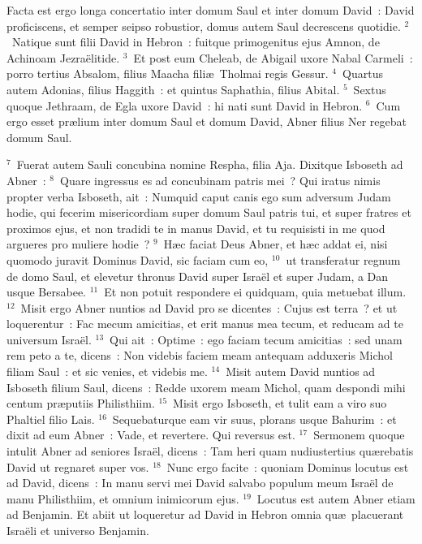 \lettrine[lines=3,image=true,loversize=0.05,lraise=-0.03]{F}{}acta est ergo longa concertatio inter domum Saul et inter domum David~: David proficiscens, et semper seipso robustior, domus autem Saul decrescens quotidie.
${}^{2}$~Natique sunt filii David in Hebron~: fuitque primogenitus ejus Amnon, de Achinoam Jezra\"elitide.
${}^{3}$~Et post eum Cheleab, de Abigail uxore Nabal Carmeli~: porro tertius Absalom, filius Maacha fili\ae\ Tholmai regis Gessur.
${}^{4}$~Quartus autem Adonias, filius Haggith~: et quintus Saphathia, filius Abital.
${}^{5}$~Sextus quoque Jethraam, de Egla uxore David~: hi nati sunt David in Hebron.
${}^{6}$~Cum ergo esset pr\ae lium inter domum Saul et domum David, Abner filius Ner regebat domum Saul.


${}^{7}$~Fuerat autem Sauli concubina nomine Respha, filia Aja. Dixitque Isboseth ad Abner~:
${}^{8}$~Quare ingressus es ad concubinam patris mei~? Qui iratus nimis propter verba Isboseth, ait~: Numquid caput canis ego sum adversum Judam hodie, qui fecerim misericordiam super domum Saul patris tui, et super fratres et proximos ejus, et non tradidi te in manus David, et tu requisisti in me quod argueres pro muliere hodie~?
${}^{9}$~H\ae c faciat Deus Abner, et h\ae c addat ei, nisi quomodo juravit Dominus David, sic faciam cum eo,
${}^{10}$~ut transferatur regnum de domo Saul, et elevetur thronus David super Isra\"el et super Judam, a Dan usque Bersabee.
${}^{11}$~Et non potuit respondere ei quidquam, quia metuebat illum.
${}^{12}$~Misit ergo Abner nuntios ad David pro se dicentes~: Cujus est terra~? et ut loquerentur~: Fac mecum amicitias, et erit manus mea tecum, et reducam ad te universum Isra\"el.
${}^{13}$~Qui ait~: Optime~: ego faciam tecum amicitias~: sed unam rem peto a te, dicens~: Non videbis faciem meam antequam adduxeris Michol filiam Saul~: et sic venies, et videbis me.
${}^{14}$~Misit autem David nuntios ad Isboseth filium Saul, dicens~: Redde uxorem meam Michol, quam despondi mihi centum pr\ae putiis Philisthiim.
${}^{15}$~Misit ergo Isboseth, et tulit eam a viro suo Phaltiel filio Lais.
${}^{16}$~Sequebaturque eam vir suus, plorans usque Bahurim~: et dixit ad eum Abner~: Vade, et revertere. Qui reversus est.
${}^{17}$~Sermonem quoque intulit Abner ad seniores Isra\"el, dicens~: Tam heri quam nudiustertius qu\ae rebatis David ut regnaret super vos.
${}^{18}$~Nunc ergo facite~: quoniam Dominus locutus est ad David, dicens~: In manu servi mei David salvabo populum meum Isra\"el de manu Philisthiim, et omnium inimicorum ejus.
${}^{19}$~Locutus est autem Abner etiam ad Benjamin. Et abiit ut loqueretur ad David in Hebron omnia qu\ae\ placuerant Isra\"eli et universo Benjamin.
